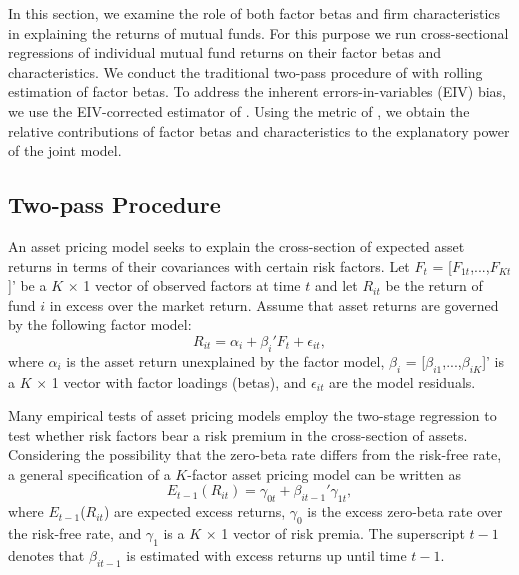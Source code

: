 \label{section3}
In this section, we examine the role of both factor betas and firm characteristics in explaining the returns of mutual funds. For this purpose we run cross-sectional regressions of individual mutual fund returns on their factor betas and characteristics. We conduct the traditional two-pass procedure of \citet{fama1973risk} with rolling estimation of factor betas. To address the inherent errors-in-variables (EIV) bias, we use the EIV-corrected estimator of \citet{chordia2015cross}. Using the metric of \citet{lindeman1980introduction}, we obtain the relative contributions of factor betas and characteristics to the explanatory power of the joint model. 

\subsection{Two-pass Procedure}
\label{twopass}
An asset pricing model seeks to explain the cross-section of expected asset returns in terms of their covariances with certain risk factors. Let $F_t$ = [$F_{1t}$,...,$F_{Kt}$]' be a $K$ $\times$ 1 vector of observed factors at time $t$ and let $R_{it}$ be the return of fund $i$ in excess over the market return. Assume that asset returns are governed by the following factor model:
\begin{equation}
    \label{factor_model}
    R_{it} =  \alpha_{i} + \beta_{i}' F_t + \epsilon_{it},
\end{equation}
where $\alpha_{i}$ is the asset return unexplained by the factor model, $\beta_i$ =  [$\beta_{i1}$,...,$\beta_{iK}$]' is a $K$ $\times$ 1 vector with factor loadings (betas), and $\epsilon_{it}$ are the model residuals.\par Many empirical tests of asset pricing models employ the \citet{fama1973risk} two-stage regression to test whether risk factors bear a risk premium in the cross-section of assets. Considering the possibility that the zero-beta rate differs from the risk-free rate, a general specification of a $K$-factor asset pricing model can be written as 
\begin{equation}
\label{fama}
E_{t-1}(R_{it}) = \gamma_{0t} + \beta_{it-1}'\gamma_{1t},
\end{equation}
where $E_{t-1}$($R_{it}$) are expected excess returns,  $\gamma_0$ is the excess zero-beta rate over the risk-free rate, and $\gamma_1$ is a $K$ $\times$ 1 vector of risk premia. The superscript $t-1$ denotes that $\beta_{it-1}$ is estimated with excess returns up until time $t-1$. 

